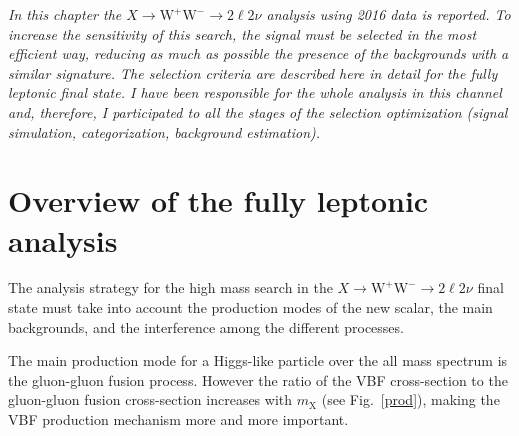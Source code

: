 \textit{%
In this chapter the $X \to \mathrm{W^+W^-}\to2\ell2\nu$ analysis using 2016 data is reported. To increase the sensitivity of this search, the signal must be selected in the most efficient way, reducing as much as possible the
presence of the backgrounds with a similar signature. The selection criteria are described here in detail for the fully leptonic final state. I have been responsible for the whole analysis in this channel and, therefore, I participated to all the stages of the selection optimization (signal simulation, categorization, background estimation).} 

\section{Overview of the fully leptonic analysis }\label{sec:AnalysisStrategy_Intro}
The analysis strategy for the high mass search in the $X \to \mathrm{W^+W^-}\to2\ell2\nu$ final state must take into account the production modes of the new scalar, the main backgrounds, and the interference among the different processes. 

The main production mode for a Higgs-like particle over the all mass spectrum is the gluon-gluon fusion process. 
However the ratio of the VBF cross-section to the gluon-gluon fusion cross-section increases with $m_\mathrm{X}$ (see Fig.~\ref{prod}), making the VBF production mechanism more and more important.\\

